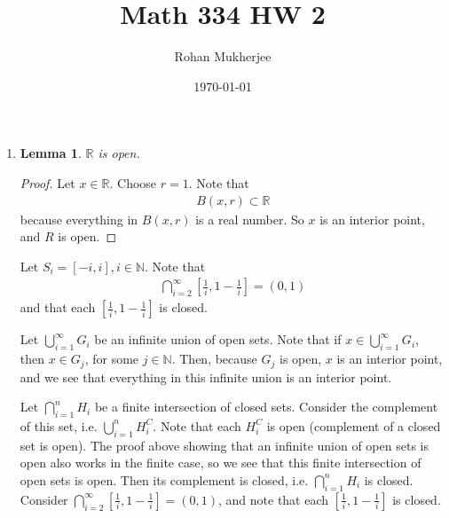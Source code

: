 \documentclass[12pt]{article}
\title{Math 334 HW 2}
\date{\today}
\author{Rohan Mukherjee}
\newtheorem{lemma}[theorem]{Lemma}
\theoremstyle{definition}
\theoremstyle{remark}
\newcommand{\R}{\mathbb{R}}
\begin{document}
	\maketitle
	\begin{enumerate}[leftmargin=\labelsep]
		\item 
		\begin{lemma}
			$\R$ is open.
		\end{lemma}
		\begin{proof}
			Let $x \in \R$. Choose $r = 1$. Note that
			\begin{align*}
				B(x, r) \subset \R
			\end{align*}
		because everything in $B(x, r)$ is a real number. So $x$ is an interior point, and $R$ is open.
		\end{proof}
		Let $S_i = [-i, i], i \in \mathbb{N}$. Note that
		\begin{align*}
			\bigcap_{i=2}^{\infty} \left[\frac1i, 1-\frac1i\right] = (0, 1)
		\end{align*}
		and that each $\left[\frac1i, 1-\frac1i\right]$ is closed. 
		
		Let $\bigcup_{i=1}^{\infty} G_i$ be an infinite union of open sets. Note that if $x \in \bigcup_{i=1}^{\infty} G_i$, then $x \in G_j$, for some $j \in \mathbb{N}$. Then, because $G_j$ is open, $x$ is an interior point, and we see that everything in this infinite union is an interior point.
		
		Let $\bigcap_{i=1}^{n} H_i$ be a finite intersection of closed sets. Consider the complement of this set, i.e. $\bigcup_{i=1}^{n} H_i^C$. Note that each $H_i^C$ is open (complement of a closed set is open). The proof above showing that an infinite union of open sets is open also works in the finite case, so we see that this finite intersection of open sets is open. Then its complement is closed, i.e. $\bigcap_{i=1}^{n} H_i$ is closed. Consider $\bigcap_{i=2}^{\infty} \left[\frac1i, 1-\frac1i\right] = (0, 1)$, and note that each $\left[\frac1i, 1-\frac1i\right]$ is closed. 
		

\end{enumerate}
\end{document}
